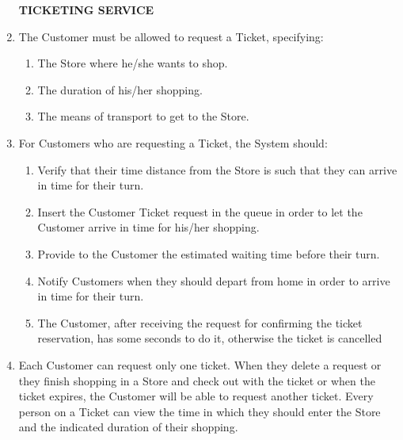 \documentclass[a4paper, 10pt, oneside]{article}
\begin{document}
\begin{enumerate}[align=left, label={R.\arabic{*}}]
    \item[\textbf{TICKETING SERVICE}]
    \item \label{req:requestTicket} The Customer must be allowed to request a Ticket, specifying:
     \begin{enumerate}[label={-}]
        \item \label{req:requestTicket:store} The Store where he/she wants to shop.
        \item \label{req:requestTicket:duration}The duration of his/her shopping.
        \item \label{req:requestTicket:transport}The means of transport to get to the Store.
    \end{enumerate}
    \item \label{req:systemTicket}For Customers who are requesting a Ticket, the System should:
    \begin{enumerate}[label={-}]
        \item \label{req:systemTicket:verifyDist} Verify that their time distance from the Store is such that they can arrive in time for their turn.
        \item \label{req:systemTicket:addInQueue}Insert the Customer Ticket request in the queue in order to let the Customer arrive in time for his/her shopping.
        \item \label{req:systemTicket:waitingTime} Provide to the Customer the estimated waiting time before their turn.
        \item \label{req:systemTicket:notifForDepart} Notify Customers when they should depart from home in order to arrive in time for their turn.
        \item \label{req:systemTicket:reserveTimeout}The Customer, after receiving the request for confirming the ticket reservation, has some seconds to do it, otherwise the ticket is cancelled
    \end{enumerate}
    \item \label{req:numberTicketPerCust} Each Customer can request only one ticket. When they delete a request or they finish shopping in a Store and check out with the ticket or when the ticket expires, the Customer will be able to request another ticket.
    \label{req:codeUnique:ticketInfo}Every person on a Ticket can view the time in which they should enter the Store and the indicated duration of their shopping.
    

\end{enumerate}
\end{document}

